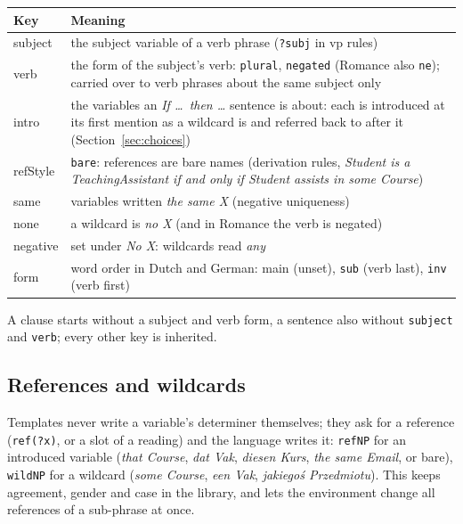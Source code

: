 \documentclass[11pt, a4paper]{article}
\newcommand{\code}[1]{\texttt{\color{codefg}#1}}
\begin{document}
\begin{center}
\small
\begin{tabularx}{\textwidth}{>{\ttfamily\color{codefg}}l X}
\toprule
\normalfont\textbf{Key} & \textbf{Meaning} \\
\midrule
subject & the subject variable of a verb phrase (\code{?subj} in vp rules) \\
verb & the form of the subject's verb: \code{plural}, \code{negated}
  (Romance also \code{ne}); carried over to verb phrases about the same
  subject only \\
intro & the variables an \textit{If \ldots\ then \ldots} sentence is about:
  each is introduced at its first mention as a wildcard is and referred back
  to after it (Section~\ref{sec:choices}) \\
refStyle & \code{bare}: references are bare names (derivation rules,
  \textit{Student is a TeachingAssistant if and only if Student assists in
  some Course}) \\
same & variables written \textit{the same X} (negative uniqueness) \\
none & a wildcard is \textit{no X} (and in Romance the verb is negated) \\
negative & set under \textit{No X}: wildcards read \textit{any} \\
form & word order in Dutch and German: main (unset), \code{sub}
  (verb last), \code{inv} (verb first) \\
\bottomrule
\end{tabularx}
\end{center}

A clause starts without a subject and verb form, a sentence also without
\code{subject} and \code{verb}; every other key is inherited.

\subsection{References and wildcards}

Templates never write a variable's determiner themselves; they ask for a
reference (\code{ref(?x)}, or a slot of a reading) and the language writes
it: \code{refNP} for an introduced variable (\textit{that Course},
\textit{dat Vak}, \textit{diesen Kurs}, \textit{the same Email}, or bare),
\code{wildNP} for a wildcard (\textit{some Course}, \textit{een Vak},
\textit{jakiegoś Przedmiotu}). This keeps agreement, gender and case in the
library, and lets the environment change all references of a sub-phrase at
once.
\end{document}
